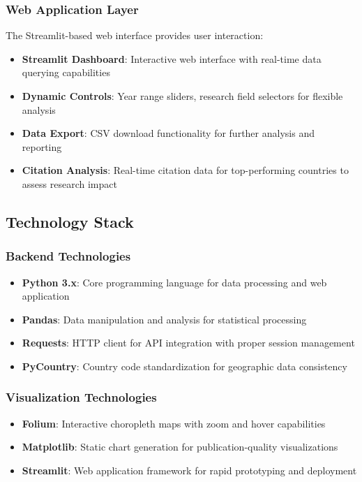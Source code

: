 \subsubsection{Web Application Layer}

The Streamlit-based web interface provides user interaction:

\begin{itemize}
\item \textbf{Streamlit Dashboard}: Interactive web interface with real-time data querying capabilities
\item \textbf{Dynamic Controls}: Year range sliders, research field selectors for flexible analysis
\item \textbf{Data Export}: CSV download functionality for further analysis and reporting
\item \textbf{Citation Analysis}: Real-time citation data for top-performing countries to assess research impact
\end{itemize}

\subsection{Technology Stack}

\subsubsection{Backend Technologies}

\begin{itemize}
\item \textbf{Python 3.x}: Core programming language for data processing and web application
\item \textbf{Pandas}: Data manipulation and analysis for statistical processing
\item \textbf{Requests}: HTTP client for API integration with proper session management
\item \textbf{PyCountry}: Country code standardization for geographic data consistency
\end{itemize}

\subsubsection{Visualization Technologies}

\begin{itemize}
\item \textbf{Folium}: Interactive choropleth maps with zoom and hover capabilities
\item \textbf{Matplotlib}: Static chart generation for publication-quality visualizations
\item \textbf{Streamlit}: Web application framework for rapid prototyping and deployment
\end{itemize}

